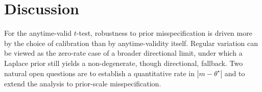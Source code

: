 \documentclass{article}
\begin{document}

\section{Discussion}
\label{sec:discussion}
For the anytime-valid $t$-test, robustness to prior misspecification is driven more by the choice of calibration than by anytime-validity itself. Regular variation can be viewed as the zero-rate case of a broader directional limit, under which a Laplace prior still yields a non-degenerate, though directional, fallback. Two natural open questions are to establish a quantitative rate in $|m-\theta^\star|$ and to extend the analysis to prior-scale misspecification.



\end{document}
